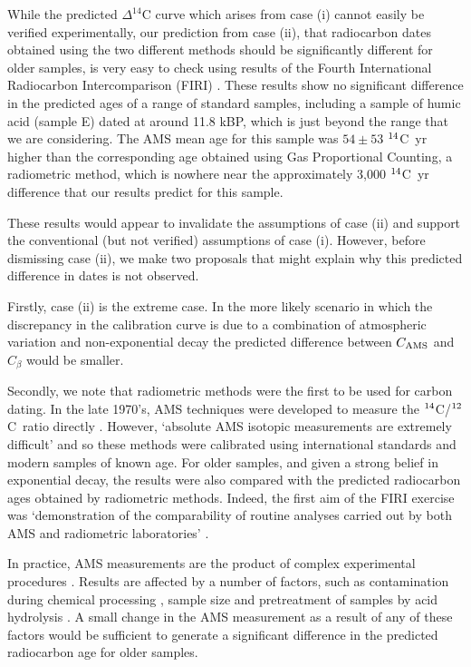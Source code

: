 \documentclass[12pt]{article}
\newcommand{\cft}{$^{\rm 14}$C}
\newcommand{\ctw}{$^{\rm 12}$C}
\begin{document}
While the predicted $\Delta^{14}$C curve which arises from 
case (i) cannot easily be verified experimentally,
our prediction from case (ii), that radiocarbon
dates obtained using the two different methods should be significantly
different for older samples, is very easy to check using results
of the Fourth International Radiocarbon Intercomparison (FIRI)
\cite{scott03}.
These results show no significant difference in the predicted ages of a
range of standard samples, including a sample of humic acid (sample E)
dated at around 11.8 kBP, which is just beyond the range that we are
considering. The AMS mean age for this sample was $54\pm 53$ \cft~yr higher 
than the corresponding age obtained using Gas Proportional Counting, a
radiometric method, which is nowhere near the approximately 3,000
\cft~yr difference that our results predict for this sample.

These results would appear to invalidate the assumptions of case (ii) and
support the conventional (but not verified) assumptions of case (i). 
However, before dismissing case (ii), we make two proposals 
that might explain why this predicted difference in dates is not observed.

Firstly, case (ii) is the extreme case. In the more likely scenario in 
which the discrepancy in the calibration curve is due to a combination of 
atmospheric variation and non-exponential decay the predicted difference 
between $C_{\rm AMS}$ and $C_\beta$ would be smaller.

Secondly, we note that radiometric methods were the first to be used for 
carbon dating. In the late 1970's,
AMS techniques were developed to measure the \cft/\ctw~ratio directly
\cite{fifield99}. However, `absolute AMS isotopic measurements are extremely 
difficult' \cite{nishiizumi07} and so these methods were
calibrated using international standards and modern samples of known age.
For older samples, and given a strong belief in exponential decay, the
results were also compared with the predicted radiocarbon ages obtained 
by radiometric methods.
Indeed, the first aim of the FIRI exercise was `demonstration
of the comparability of routine analyses carried out by both AMS and
radiometric laboratories' \cite{scott03}.

In practice, AMS measurements are the product of complex experimental
procedures \cite{fifield99}. Results are affected by a number of factors,
such as contamination during chemical processing 
\cite{donahue90,brown97,mueller02}, sample size \cite{brown97,brown01} and 
pretreatment of samples by acid hydrolysis \cite{brown01,scott03}. 
A small change in the AMS measurement as a result of any of 
these factors would be sufficient to generate a significant difference in 
the predicted radiocarbon age for older samples.
\end{document}

